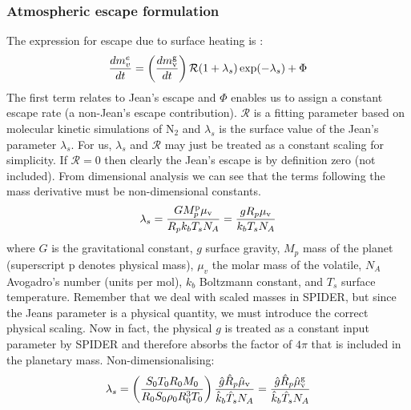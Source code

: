 \subsubsection{Atmospheric escape formulation}
The expression for escape due to surface heating is \citep{JOY15}: %
\begin{equation}
\frac{d m_v^e}{dt} = \left( \frac{d m_{\rm v}^{\rm g}}{dt} \right) \mathcal{R} (1 + \lambda_s) \exp(-\lambda_s) + \Phi
\end{equation}
The first term relates to Jean's escape and $\Phi$ enables us to assign a constant escape rate (a non-Jean's escape contribution).  $\mathcal{R}$ is a fitting parameter based on molecular kinetic simulations of N$_2$ \citep{VJT11,VTE11} and $\lambda_s$ is the surface value of the Jean's parameter $\lambda_s$.  For us, $\lambda_s$ and $\mathcal{R}$ may just be treated as a constant scaling for simplicity.  If $\mathcal{R}=0$ then clearly the Jean's escape is by definition zero (not included).  From dimensional analysis we can see that the terms following the mass derivative must be non-dimensional constants.
\begin{equation}
\lambda_s =  \frac{G M_p^{\rm p} \mu_{\rm v}}{R_p k_b T_s N_A} = \frac{g R_p \mu_{\rm v}}{k_b T_s N_A}
\end{equation}
where $G$ is the gravitational constant, $g$ surface gravity, $M_p$ mass of the planet (superscript p denotes physical mass), $\mu_v$ the molar mass of the volatile, $N_A$ Avogadro's number (units per mol), $k_b$ Boltzmann constant, and $T_s$ surface temperature.  Remember that we deal with scaled masses in SPIDER, but since the Jeans parameter is a physical quantity, we must introduce the correct physical scaling.  Now in fact, the physical $g$ is treated as a constant input parameter by SPIDER and therefore absorbs the factor of $4 \pi$ that is included in the planetary mass.  Non-dimensionalising:
\begin{equation}
\lambda_s = \left( \frac{S_0 T_0 R_0 M_0}{R_0 S_0 \rho_0 R_0^3 T_0} \right) \frac{\hat{g} \hat{R}_p \hat{\mu}_{\rm v}}{\hat{k}_b \hat{T}_s N_A} = \frac{\hat{g} \hat{R}_p \hat{\mu}_{\rm v}^{\rm g}}{\hat{k}_b \hat{T}_s N_A}
\end{equation}
